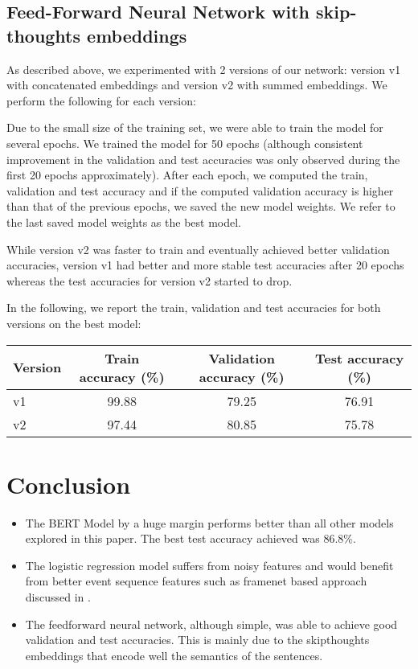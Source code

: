 \documentclass{article}
\begin{document}
\subsection{Feed-Forward Neural Network with skip-thoughts embeddings}
As described above, we experimented with 2 versions of our network: version v1 with concatenated embeddings and version v2 with summed embeddings. We perform the following for each version:

Due to the small size of the training set, we were able to train the model for several epochs. We trained the model for 50 epochs (although consistent improvement in the validation and test accuracies was only observed during the first 20 epochs approximately). After each epoch, we computed the train, validation and test accuracy and if the computed validation accuracy is higher than that of the previous epochs, we saved the new model weights. We refer to the last saved model weights as the best model.

While version v2 was faster to train and eventually achieved better validation accuracies, version v1 had better and more stable test accuracies after 20 epochs whereas the test accuracies for version v2 started to drop.

In the following, we report the train, validation and test accuracies for both versions on the best model:
\begin{center}
	\scriptsize{
		\begin{tabular}{|l|c|c|c|}
			\hline Version & Train accuracy (\%) & Validation accuracy (\%) & Test accuracy (\%)\\
			\hline v1 &  99.88  & 79.25 & 76.91 \\
			\hline v2 & 97.44  & 80.85 & 75.78\\
			\hline
	    \end{tabular}
	}
\end{center}

\section{Conclusion}
\begin{itemize}
    \item The BERT Model by a huge margin performs better than all other models explored in this paper. The best test accuracy achieved was $86.8\%$.
    \item The logistic regression model suffers from noisy features and would benefit from better event sequence features such as framenet based approach discussed in \cite{hcm}.
    \item The feedforward neural network, although simple, was able to achieve good validation and test accuracies. This is mainly due to the skipthoughts embeddings that encode well the semantics of the sentences. 
    \end{itemize}
\end{document}
